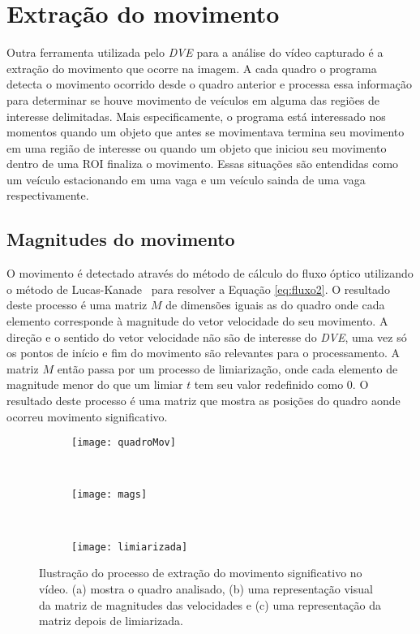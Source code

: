 \section{Extração do movimento}

Outra ferramenta utilizada pelo \textit{DVE} para a análise do vídeo capturado é a extração do movimento que ocorre na imagem. A cada quadro o programa detecta o movimento ocorrido desde o quadro anterior e processa essa informação para determinar se houve movimento de veículos em alguma das regiões de interesse delimitadas. Mais especificamente, o programa está interessado nos momentos quando um objeto que antes se movimentava termina seu movimento em uma região de interesse ou quando um objeto que iniciou seu movimento dentro de uma ROI finaliza o movimento. Essas situações são entendidas como um veículo estacionando em uma vaga e um veículo sainda de uma vaga respectivamente.

\subsection{Magnitudes do movimento}

O movimento é detectado através do método de cálculo do fluxo óptico utilizando o método de Lucas-Kanade~\cite{bruhn2005lucas,faria1992fluxo,mota2011tensor} para resolver a Equação \ref{eq:fluxo2}. O resultado deste processo é uma matriz $M$ de dimensões iguais as do quadro onde cada elemento corresponde à magnitude do vetor velocidade do seu movimento. A direção e o sentido do vetor velocidade não são de interesse do \textit{DVE}, uma vez só os pontos de início e fim do movimento são relevantes para o processamento. A matriz $M$ então passa por um processo de limiarização, onde cada elemento de magnitude menor do que um limiar $t$ tem seu valor redefinido como $0$. O resultado deste processo é uma matriz que mostra as posições do quadro aonde ocorreu movimento significativo. 



\begin{figure}
\centering
\begin{subfigure}{.5\textwidth}
  \centering
  \texttt{[image: quadroMov]}
  \caption{}
  \label{fig:ilustraMovimento:sub:quadro}
\end{subfigure}\\
\begin{subfigure}{.5\textwidth}
  \centering
  \texttt{[image: mags]}
  \caption{}
  \label{fig:ilustraMovimento:sub:mags}
\end{subfigure}\\
\begin{subfigure}{.5\textwidth}
  \centering
  \texttt{[image: limiarizada]}
  \caption{}
  \label{fig:ilustraMovimento:sub:limiarizada}
\end{subfigure}
\centering
\caption{Ilustração do processo de extração do movimento significativo no vídeo. (a) mostra o quadro analisado, (b) uma representação visual da matriz de magnitudes das velocidades e (c) uma representação da matriz depois de limiarizada.}
\label{fig:ilustraMovimento}
\end{figure}


